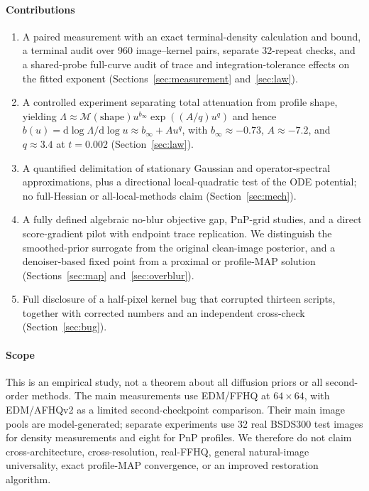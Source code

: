 \documentclass[10pt,journal]{IEEEtran}
\newcommand{\Lam}{\Lambda}
\begin{document}
\paragraph*{Contributions}
\begin{enumerate}
  \item A paired measurement with an exact terminal-density calculation and bound, a terminal
        audit over 960 image--kernel pairs, separate 32-repeat checks, and a shared-probe
        full-curve audit of trace and integration-tolerance effects on the fitted exponent
        (Sections~\ref{sec:measurement} and~\ref{sec:law}).
  \item A controlled experiment separating total attenuation from profile shape, yielding
        $\Lam\approx \mathcal M(\mathrm{shape})u^{b_\infty}\exp((A/q)u^q)$ and hence
        $b(u)=\mathrm d\log\Lam/\mathrm d\log u\approx b_\infty+Au^q$, with
        $b_\infty\approx-0.73$, $A\approx-7.2$, and $q\approx3.4$ at $t=0.002$
        (Section~\ref{sec:law}).
  \item A quantified delimitation of stationary Gaussian and operator-spectral approximations,
        plus a directional local-quadratic test of the ODE potential; no full-Hessian or
        all-local-methods claim (Section~\ref{sec:mech}).
  \item A fully defined algebraic no-blur objective gap, PnP-grid studies, and a direct
        score-gradient pilot with endpoint trace replication. We distinguish the smoothed-prior
        surrogate from the original clean-image posterior, and a denoiser-based fixed point
        from a proximal or profile-MAP solution (Sections~\ref{sec:map} and~\ref{sec:overblur}).
  \item Full disclosure of a half-pixel kernel bug that corrupted thirteen scripts, together
        with corrected numbers and an independent cross-check (Section~\ref{sec:bug}).
\end{enumerate}

\paragraph*{Scope}
This is an empirical study, not a theorem about all diffusion priors or all second-order
methods. The main measurements use EDM/FFHQ at $64\times64$, with EDM/AFHQv2 as a limited
second-checkpoint comparison. Their main image pools are model-generated; separate experiments
use 32 real BSDS300 test images for density measurements and eight for PnP profiles. We therefore
do not claim cross-architecture, cross-resolution, real-FFHQ, general natural-image
universality, exact profile-MAP convergence, or an improved restoration algorithm.
\end{document}
